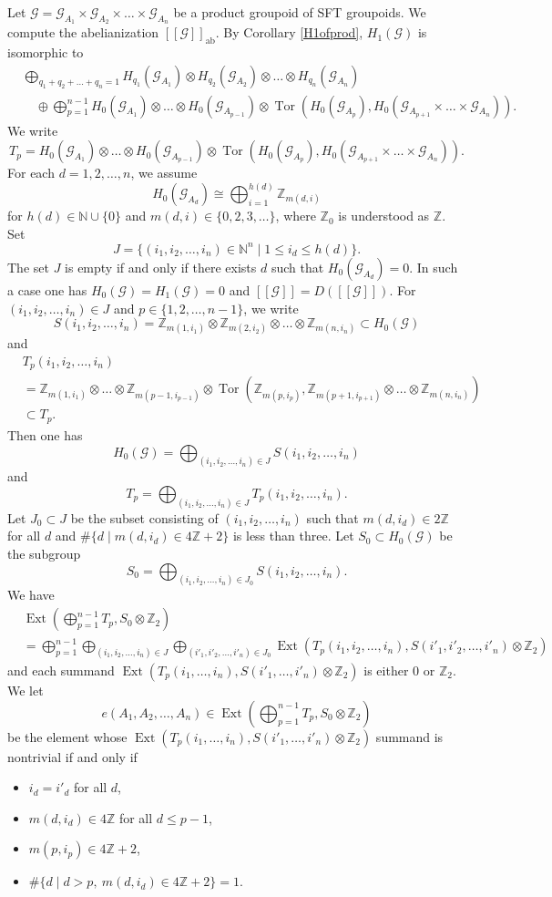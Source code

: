 \documentclass[11pt]{article}
\theoremstyle{definition}
\numberwithin{equation}{section}
\newcommand{\Ext}{\operatorname{Ext}}
\newcommand{\Tor}{\operatorname{Tor}}
\newcommand{\ab}{\mathrm{ab}}
\newcommand{\G}{\mathcal{G}}
\newcommand{\N}{\mathbb{N}}
\newcommand{\Z}{\mathbb{Z}}
\begin{document}
Let $\G=\G_{A_1}\times\G_{A_2}\times\dots\times\G_{A_n}$ be 
a product groupoid of SFT groupoids. 
We compute the abelianization $[[\G]]_\ab$. 
By Corollary \ref{H1ofprod}, $H_1(\G)$ is isomorphic to 
\begin{align*}
&\bigoplus_{q_1+q_2+\dots+q_n=1}
H_{q_1}(\G_{A_1})\otimes H_{q_2}(\G_{A_2})\otimes\dots
\otimes H_{q_n}(\G_{A_n})\\
&\quad\oplus\bigoplus_{p=1}^{n-1}
H_0(\G_{A_1})\otimes\dots\otimes H_0(\G_{A_{p-1}})
\otimes\Tor(H_0(\G_{A_p}),H_0(\G_{A_{p+1}}\times\dots\times \G_{A_n})). 
\end{align*}
We write 
\[
T_p=H_0(\G_{A_1})\otimes\dots\otimes H_0(\G_{A_{p-1}})
\otimes\Tor(H_0(\G_{A_p}),H_0(\G_{A_{p+1}}\times\dots\times \G_{A_n})). 
\]
For each $d=1,2,\dots,n$, we assume 
\[
H_0(\G_{A_d})\cong\bigoplus_{i=1}^{h(d)}\Z_{m(d,i)}
\]
for $h(d)\in\N\cup\{0\}$ and $m(d,i)\in\{0,2,3,\dots\}$, 
where $\Z_0$ is understood as $\Z$. 
Set 
\[
J=\{(i_1,i_2,\dots,i_n)\in\N^n\mid1\leq i_d\leq h(d)\}. 
\]
The set $J$ is empty if and only if 
there exists $d$ such that $H_0(\G_{A_d})=0$. 
In such a case one has $H_0(\G)=H_1(\G)=0$ and $[[\G]]=D([[\G]])$. 
For $(i_1,i_2,\dots,i_n)\in J$ and $p\in\{1,2,\dots,n{-}1\}$, 
we write 
\[
S(i_1,i_2,\dots,i_n)
=\Z_{m(1,i_1)}\otimes\Z_{m(2,i_2)}\otimes\dots\otimes\Z_{m(n,i_n)}
\subset H_0(\G)
\]
and 
\begin{align*}
&T_p(i_1,i_2,\dots,i_n)\\
&=\Z_{m(1,i_1)}\otimes\dots\otimes\Z_{m(p-1,i_{p-1})}\otimes
\Tor(\Z_{m(p,i_p)},\Z_{m(p+1,i_{p+1})}\otimes\dots\otimes\Z_{m(n,i_n)})\\
&\subset T_p. 
\end{align*}
Then one has 
\[
H_0(\G)=\bigoplus_{(i_1,i_2,\dots,i_n)\in J}S(i_1,i_2,\dots,i_n)
\]
and 
\[
T_p=\bigoplus_{(i_1,i_2,\dots,i_n)\in J}T_p(i_1,i_2,\dots,i_n). 
\]
Let $J_0\subset J$ be the subset consisting of $(i_1,i_2,\dots,i_n)$ 
such that $m(d,i_d)\in2\Z$ for all $d$ and 
$\#\{d\mid m(d,i_d)\in4\Z{+}2\}$ is less than three. 
Let $S_0\subset H_0(\G)$ be the subgroup 
\[
S_0=\bigoplus_{(i_1,i_2,\dots,i_n)\in J_0}S(i_1,i_2,\dots,i_n). 
\]
We have 
\begin{align*}
&\Ext\left(\bigoplus_{p=1}^{n-1}T_p,S_0\otimes\Z_2\right)\\
&=\bigoplus_{p=1}^{n-1}\bigoplus_{(i_1,i_2,\dots,i_n)\in J}
\bigoplus_{(i'_1,i'_2,\dots,i'_n)\in J_0}
\Ext\left(T_p(i_1,i_2,\dots,i_n),S(i'_1,i'_2,\dots,i'_n)\otimes\Z_2\right)
\end{align*}
and each summand 
$\Ext(T_p(i_1,\dots,i_n),S(i'_1,\dots,i'_n)\otimes\Z_2)$ is 
either $0$ or $\Z_2$. 
We let 
\[
e(A_1,A_2,\dots,A_n)
\in\Ext\left(\bigoplus_{p=1}^{n-1}T_p,S_0\otimes\Z_2\right)
\]
be the element whose 
$\Ext(T_p(i_1,\dots,i_n),S(i'_1,\dots,i'_n)\otimes\Z_2)$ summand is 
nontrivial if and only if 
\begin{itemize}
\item $i_d{=}i'_d$ for all $d$, 
\item $m(d,i_d)\in4\Z$ for all $d\leq p{-}1$, 
\item $m(p,i_p)\in4\Z+2$, 
\item $\#\{d\mid d>p,\ m(d,i_d)\in4\Z{+}2\}=1$. 
\end{itemize}
\end{document}
